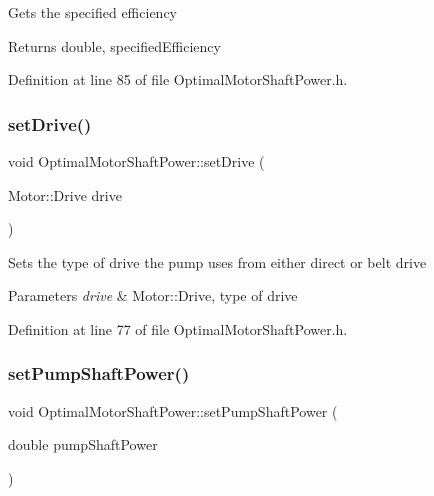 Gets the specified efficiency \begin{DoxyReturn}{Returns}
double, specified\+Efficiency 
\end{DoxyReturn}


Definition at line 85 of file Optimal\+Motor\+Shaft\+Power.\+h.

\mbox{\label{class_optimal_motor_shaft_power_a8f3288a69848c61f4e8e2b14da549d16}} 
\subsubsection{\texorpdfstring{set\+Drive()}{setDrive()}}
{\footnotesize\ttfamily void Optimal\+Motor\+Shaft\+Power\+::set\+Drive (\begin{DoxyParamCaption}\item[{Motor\+::\+Drive}]{drive }\end{DoxyParamCaption})\hspace{0.3cm}{\ttfamily [inline]}}

Sets the type of drive the pump uses from either direct or belt drive 
\begin{DoxyParams}{Parameters}
{\em drive} & Motor\+::\+Drive, type of drive \\
\hline
\end{DoxyParams}


Definition at line 77 of file Optimal\+Motor\+Shaft\+Power.\+h.

\mbox{\label{class_optimal_motor_shaft_power_ab2d80927fbaa62705359700b2a8f2f26}} 
\subsubsection{\texorpdfstring{set\+Pump\+Shaft\+Power()}{setPumpShaftPower()}}
{\footnotesize\ttfamily void Optimal\+Motor\+Shaft\+Power\+::set\+Pump\+Shaft\+Power (\begin{DoxyParamCaption}\item[{double}]{pump\+Shaft\+Power }\end{DoxyParamCaption})\hspace{0.3cm}{\ttfamily [inline]}}

